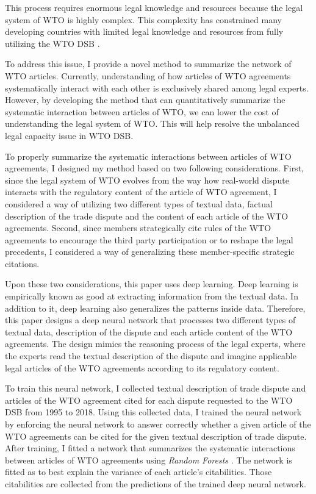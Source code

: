 This process requires enormous legal knowledge and resources because the legal system of WTO is highly complex.
This complexity has constrained many developing countries with limited legal knowledge and resources from fully utilizing the WTO DSB
\citep{busch_reinhardt_shaffer_2009, dev_busch, shaffer_2006}. 
 
To address this issue, I provide a novel method to summarize the network of WTO articles.
Currently, understanding of how articles of WTO agreements systematically interact with each other is exclusively shared among legal experts.
However, by developing the method that can quantitatively summarize the systematic interaction between articles of WTO,
we can lower the cost of understanding the legal system of WTO. This will help resolve the unbalanced legal capacity issue in WTO DSB.
 
To properly summarize the systematic interactions between articles of WTO agreements, I designed my method based on two following considerations.
First, since the legal system of WTO evolves from the way how real-world dispute interacts with the regulatory content of the article of WTO agreement,
I considered a way of utilizing two different types of textual data, factual description of the trade dispute and the content of each article of the WTO agreements.
Second, since members strategically cite rules of the WTO agreements to encourage
the third party participation \citep{who_gets} or to reshape the legal precedents\citep{pelc, latent},
I considered a way of generalizing these member-specific strategic citations.
 
Upon these two considerations, this paper uses deep learning.
Deep learning is empirically known as good at extracting information from the textual data.
In addition to it, deep learning also generalizes the patterns inside data.
Therefore, this paper designs a deep neural network that
processes two different types of textual data,
description of the dispute and each article content of the WTO agreements.
The design mimics the reasoning process of the legal experts,
where the experts read
the textual description of the dispute and imagine applicable legal articles of the WTO agreements according to its regulatory content.
 
To train this neural network, I collected textual description of trade dispute and articles of the WTO agreement cited for each dispute requested to the WTO DSB
from 1995 to 2018.
Using this collected data, I trained the neural network by enforcing the neural network to answer correctly
whether a given article of the WTO agreements
can be cited for the given textual description of
trade dispute.
After training, I fitted a network that summarizes the systematic interactions between articles of WTO agreements using \textit{Random Forests} \citep{rf, genie3}.
The network is fitted as to best explain the variance of each article's citabilities. Those citabilities are collected from the predictions of the trained deep neural network.
 
